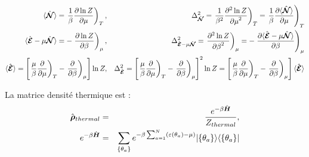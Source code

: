 	\begin{eqnarray}
		\langle \hat{\bm{\mathcal{N}}} \rangle  = \left .\frac{1}{\beta} \frac{ \partial \ln Z}{\partial \mu } \right )_T,  & & \Delta^2_{\hat{\bm{\mathcal{N}}}} = \left . \frac{1}{\beta^2} \frac{ \partial^2 \ln Z}{{\partial \mu}^2 } \right )_T =  \left . \frac{1}{\beta} \frac{ \partial \langle \hat{\bm{\mathcal{N}}} \rangle}{\partial \mu } \right )_T\\
		\langle \hat{\bm{\mathcal{E}}} - \mu\hat{\bm{\mathcal{N}}}  \rangle  = -\left . \frac{ \partial \ln Z}{\partial \beta } \right )_\mu,  & & \Delta^2_{\hat{\bm{\mathcal{E}}} - \mu\hat{\bm{\mathcal{N}}}} = \left .  \frac{ \partial^2 \ln Z}{{\partial \beta}^2 } \right )_\mu =  -\left .  \frac{ \partial \langle \hat{\bm{\mathcal{E}}} - \mu\hat{\bm{\mathcal{N}}} \rangle}{\partial \beta } \right )_\mu	\\
		\langle \hat{\bm{\mathcal{E}}} \rangle  = \left [ \left .\frac{\mu}{\beta} \frac{ \partial}{\partial \mu } \right )_T -\left . \frac{ \partial }{\partial \beta } \right )_\mu  \right ]\ln Z,  & & \Delta^2_{\hat{\bm{\mathcal{E}}} } = \left [ \left .\frac{\mu}{\beta} \frac{ \partial}{\partial \mu } \right )_T -\left . \frac{ \partial }{\partial \beta } \right )_\mu  \right ]^2\ln Z=  \left [ \left .\frac{\mu}{\beta} \frac{ \partial}{\partial \mu } \right )_T -\left . \frac{ \partial }{\partial \beta } \right )_\mu  \right ]\langle \hat{\bm{\mathcal{E}}} \rangle	
	\end{eqnarray}

	
	
	La matrice densité thermique est :
	\begin{eqnarray}
		\hat{\bm{\rho}}_{thermal} & = & \frac{e^{- \beta \hat{\bm{H}}}}{Z_{thermal}}, \\
		e^{-\beta \hat{\bm{H}}} & = & 	\sum_{\{\theta_a \}} e^{- \beta \sum_{a=1}^N ( \varepsilon(\theta_a)- \mu ) } \vert \{ \theta_a\} \rangle \langle  \{ \theta_a\}  \vert 
	\end{eqnarray}